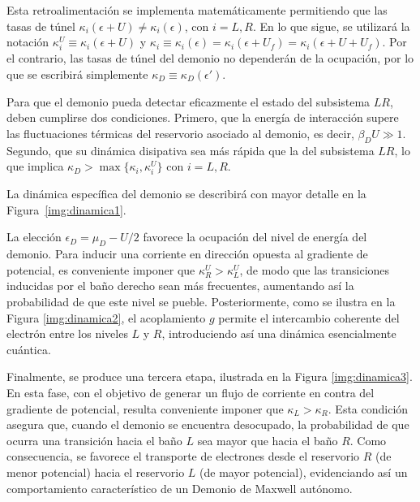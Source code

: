 Esta retroalimentación se implementa matemáticamente permitiendo que las tasas de túnel $\kappa_{i}(\epsilon + U) \neq \kappa_{i}(\epsilon)$, con $i = L, R$. En lo que sigue, se utilizará la notación $\kappa^{U}_{i} \equiv \kappa_{i}(\epsilon+U)$ y $\kappa_{i} \equiv \kappa_{i}(\epsilon)=\kappa_{i}(\epsilon+U_{f})=\kappa_{i}(\epsilon+U+U_{f})$. Por el contrario, las tasas de túnel del demonio no dependerán de la ocupación, por lo que se escribirá simplemente $\kappa_{D}\equiv \kappa_{D}(\epsilon')$.

Para que el demonio pueda detectar eficazmente el estado del subsistema $LR$, deben cumplirse dos condiciones. Primero, que la energía de interacción supere las fluctuaciones térmicas del reservorio asociado al demonio, es decir, $\beta_{D} U \gg 1$. Segundo, que su dinámica disipativa sea más rápida que la del subsistema $LR$, lo que implica $\kappa_{D} > \max\{\kappa_{i}, \kappa^{U}_{i}\}$ con $i = L, R$.

La dinámica específica del demonio se describirá con mayor detalle en la Figura~\ref{img:dinamica1}.


La elección $\epsilon_D = \mu_D - U/2$ favorece la ocupación del nivel de energía del demonio. Para inducir una corriente en dirección opuesta al gradiente de potencial, es conveniente imponer que $\kappa^{U}_{R} > \kappa^{U}_{L}$, de modo que las transiciones inducidas por el baño derecho sean más frecuentes, aumentando así la probabilidad de que este nivel se pueble. Posteriormente, como se ilustra en la Figura \ref{img:dinamica2}, el acoplamiento $g$ permite el intercambio coherente del electrón entre los niveles $L$ y $R$, introduciendo así una dinámica esencialmente cuántica.



Finalmente, se produce una tercera etapa, ilustrada en la Figura \ref{img:dinamica3}. En esta fase, con el objetivo de generar un flujo de corriente en contra del gradiente de potencial, resulta conveniente imponer que $\kappa_{L} > \kappa_{R}$. Esta condición asegura que, cuando el demonio se encuentra desocupado, la probabilidad de que ocurra una transición hacia el baño $L$ sea mayor que hacia el baño $R$. Como consecuencia, se favorece el transporte de electrones desde el reservorio $R$ (de menor potencial) hacia el reservorio $L$ (de mayor potencial), evidenciando así un comportamiento característico de un Demonio de Maxwell autónomo.


